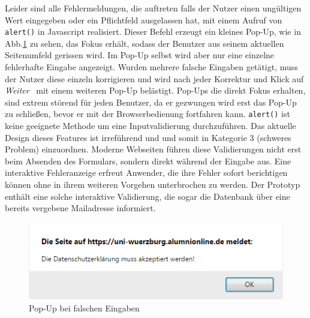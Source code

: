 { Leider sind alle Fehlermeldungen, die auftreten falls der Nutzer einen ungültigen Wert eingegeben oder ein Pflichtfeld ausgelassen hat, mit einem Aufruf von \texttt{alert()} in Javascript realisiert. Dieser Befehl erzeugt ein kleines Pop-Up, wie in Abb.\ref{fig:regpopup} zu sehen, das Fokus erhält, sodass der Benutzer aus seinem aktuellen Seitenumfeld gerissen wird. Im Pop-Up selbst wird aber nur eine einzelne fehlerhafte Eingabe angezeigt. Wurden mehrere falsche Eingaben getätigt, muss der Nutzer diese einzeln korrigieren und wird nach jeder Korrektur und Klick auf \emph{Weiter} ~mit einem weiteren Pop-Up belästigt.
}
{ Pop-Ups die direkt Fokus erhalten, sind extrem störend für jeden Benutzer, da er gezwungen wird erst das Pop-Up zu schließen, bevor er mit der Browserbedienung fortfahren kann. \texttt{alert()} ist keine geeignete Methode um eine Inputvalidierung durchzuführen. Das aktuelle Design dieses Features ist irreführend und und somit in Kategorie 3 (schweres Problem) einzuordnen.
}
{ Moderne Webseiten führen diese Validierungen nicht erst beim Absenden des Formulars, sondern direkt während der Eingabe aus. Eine interaktive Fehleranzeige erfreut Anwender, die ihre Fehler sofort berichtigen können ohne in ihrem weiteren Vorgehen unterbrochen zu werden. Der Prototyp enthält eine solche interaktive Validierung, die sogar die Datenbank über eine bereits vergebene Mailadresse informiert.}
\begin{figure}
	\centering
		\includegraphics{figures/regpopup.png}
	\caption{Pop-Up bei falschen Eingaben}
	\label{fig:regpopup}
\end{figure}

